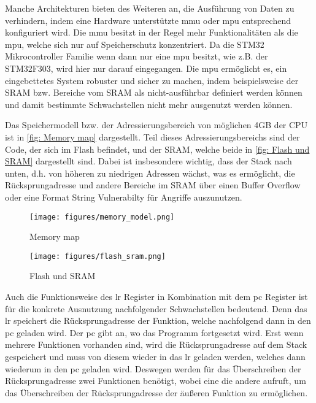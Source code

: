 \documentclass[a4paper,
DIV=13,
12pt,
BCOR=10mm,
department=FakIM,
oneside,
parskip=half,
automark,
listof=totocnumbered,
bibliography=totocnumbered,
acronym=totocnumbered
] {OTHRartcl}
\begin{document}
Manche Architekturen bieten des Weiteren an, die Ausführung von Daten zu verhindern, indem eine Hardware unterstützte \ac{mmu} oder \ac{mpu} entsprechend konfiguriert wird.
Die \ac{mmu} besitzt in der Regel mehr Funktionalitäten als die \ac{mpu}, welche sich nur auf Speicherschutz konzentriert.
Da die STM32 Mikrocontroller Familie wenn dann nur eine \ac{mpu} besitzt, wie z.B. der STM32F303, wird hier nur darauf eingegangen.
Die \ac{mpu} ermöglicht es, ein eingebettetes System robuster und sicher zu machen, indem beispielsweise der SRAM bzw. Bereiche vom SRAM als nicht-ausführbar definiert werden können
und damit bestimmte Schwachstellen nicht mehr ausgenutzt werden können. \cite{MPU}

Das Speichermodell bzw. der Adressierungsbereich von möglichen 4GB der CPU ist in \autoref{fig: Memory map} dargestellt.
Teil dieses Adressierungsbereichs sind der Code, der sich im Flash befindet, und der SRAM, welche beide in \autoref{fig: Flash und SRAM} dargestellt sind.
Dabei ist insbesondere wichtig, dass der Stack nach unten, d.h. von höheren zu niedrigen Adressen wächst, was es ermöglicht,
die Rücksprungadresse und andere Bereiche im SRAM über einen Buffer Overflow oder eine Format String Vulnerabilty für Angriffe auszunutzen.
\begin{figure}[ht!]
  \begin{minipage}[b]{.45\linewidth}
    \texttt{[image: figures/memory\_model.png]}
    \caption{Memory map}
    \label{fig: Memory map}
  \end{minipage}
  \hspace{.1\linewidth}
  \begin{minipage}[b]{.48\linewidth}
    \texttt{[image: figures/flash\_sram.png]}
    \caption{Flash und SRAM}
    \label{fig: Flash und SRAM}
  \end{minipage}
\end{figure}

Auch die Funktionsweise des \ac{lr} Register in Kombination mit dem \ac{pc} Register ist für die konkrete Ausnutzung nachfolgender Schwachstellen bedeutend.
Denn das \ac{lr} speichert die Rücksprungadresse der Funktion, welche nachfolgend dann in den \ac{pc} geladen wird. Der \ac{pc} gibt an, wo das Programm fortgesetzt wird.
Erst wenn mehrere Funktionen vorhanden sind, wird die Rücksprungadresse auf dem Stack gespeichert und muss von
diesem wieder in das \ac{lr} geladen werden, welches dann wiederum in den \ac{pc} geladen wird.
Deswegen werden für das Überschreiben der Rücksprungadresse zwei Funktionen benötigt, wobei eine die andere aufruft, um das Überschreiben der Rücksprungadresse der äußeren Funktion zu ermöglichen.
\end{document}
